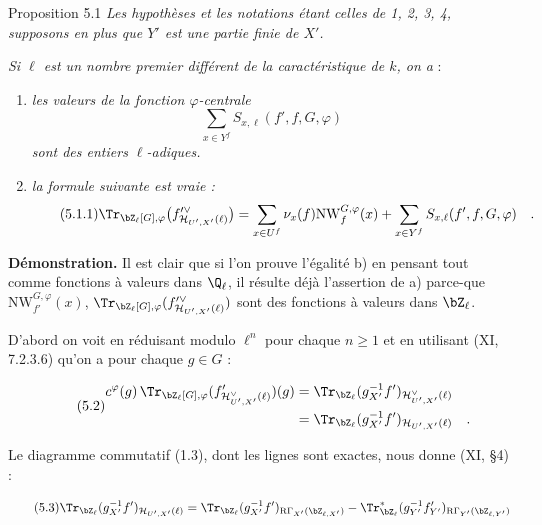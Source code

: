 \begin{statement}{Proposition 5.1}
\emph{Les hypothèses et les notations étant celles de 1, 2, 3, 4, supposons en plus que $Y'$ est une partie finie de $X'$.}

\emph{Si $\ell$ est un nombre premier différent de la caractéristique de $k$, on a} :
\begin{enumerate}[label=\alph*)]
\item \emph{les valeurs de la fonction $\varphi$-centrale}
\[
\sum_{x\in Y^f} S_{x,\ell}(f',f,G,\varphi)
\]
\emph{sont des entiers $\ell$-adiques.}
\item \emph{la formule suivante est vraie :}
\begin{equation}\tag{5.1.1}
\Tr_{\bZ_\ell[G],\varphi}\bigl(f'^\vee_{\mathcal{H}_{U',X'}(\ell)}\bigr)
= \sum_{x\in U^f}\nu_x(f)\mathrm{NW}^{G,\varphi}_f(x)+\sum_{x\in Y^f}S_{x,\ell}(f',f,G,\varphi) \quad .
\end{equation}
\end{enumerate}
\end{statement}

\noindent
\textbf{Démonstration.} Il est clair que si l'on prouve l'égalité b) en pensant tout comme fonctions à valeurs dans $\Q_\ell$, il résulte déjà l'assertion de a) parce-que $\mathrm{NW}^{G,\varphi}_{f'}(x)$, $\Tr_{\bZ_\ell[G],\varphi}(f'^\vee_{\mathcal{H}_{U',X'}(\ell)})$ sont des fonctions à valeurs dans $\bZ_\ell$.

D'abord on voit en réduisant modulo $\ell^n$ pour chaque $n \geq 1$ et en utilisant (XI, 7.2.3.6) qu'on a pour chaque $g \in G$ :

\begin{equation}\tag{5.2}
\begin{aligned}
c^\varphi(g) \, \Tr_{\bZ_\ell[G],\varphi}(f'_{\mathcal{H}^\vee_{U',X'}(\ell)})(g)
&= \Tr_{\bZ_\ell}(g_{X'}^{-1}f')_{\mathcal{H}^\vee_{U',X'}(\ell)}\\
&= \Tr_{\bZ_\ell}(g_{X'}^{-1}f')_{\mathcal{H}_{U',X'}(\ell)} \quad .
\end{aligned}
\end{equation}

Le diagramme commutatif (1.3), dont les lignes sont exactes, nous donne (XI, \S4) :

\begin{equation}\tag{5.3}
\Tr_{\bZ_\ell}(g_{X'}^{-1}f')_{\mathcal{H}_{U',X'}(\ell)} = \Tr_{\bZ_\ell}(g_{X'}^{-1}f')_{\mathrm{R}\Gamma_{X'}(\bZ_{\ell,X'})} - \Tr^*_{\bZ_\ell}(g_{Y'}^{-1}f'_{Y'})_{\mathrm{R}\Gamma_{Y'}(\bZ_{\ell,Y'})}
\end{equation}

